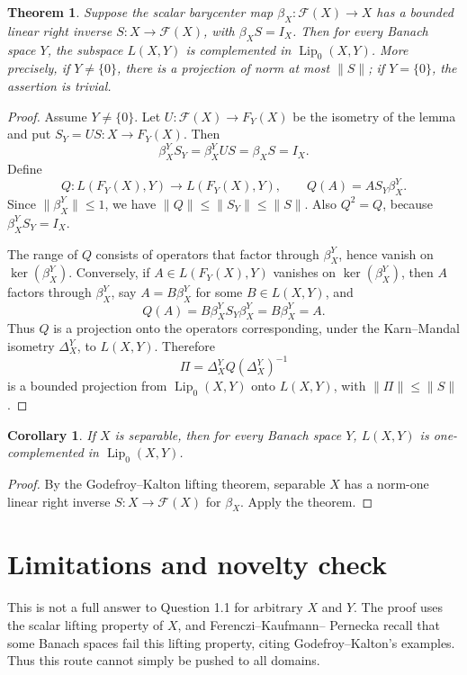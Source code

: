 \documentclass[11pt]{article}
\newtheorem{theorem}{Theorem}
\newtheorem{corollary}{Corollary}
\DeclareMathOperator{\Lip}{Lip}
\begin{document}
\begin{theorem}
Suppose the scalar barycenter map \(\beta_X:\mathcal F(X)\to X\) has a
bounded linear right inverse \(S:X\to\mathcal F(X)\), with
\(\beta_XS=I_X\). Then for every Banach space \(Y\), the subspace \(L(X,Y)\)
is complemented in \(\Lip_0(X,Y)\). More precisely, if \(Y\neq\{0\}\), there
is a projection of norm at most \(\|S\|\); if \(Y=\{0\}\), the assertion is
trivial.
\end{theorem}

\begin{proof}
Assume \(Y\neq\{0\}\). Let \(U:\mathcal F(X)\to F_Y(X)\) be the isometry of
the lemma and put \(S_Y=US:X\to F_Y(X)\). Then
\[
  \beta_X^Y S_Y=\beta_X^YUS=\beta_XS=I_X.
\]
Define
\[
  Q:L(F_Y(X),Y)\longrightarrow L(F_Y(X),Y),
  \qquad Q(A)=A S_Y\beta_X^Y.
\]
Since \(\|\beta_X^Y\|\leq 1\), we have \(\|Q\|\leq\|S_Y\|\leq\|S\|\).
Also \(Q^2=Q\), because \(\beta_X^YS_Y=I_X\).

The range of \(Q\) consists of operators that factor through \(\beta_X^Y\),
hence vanish on \(\ker(\beta_X^Y)\). Conversely, if
\(A\in L(F_Y(X),Y)\) vanishes on \(\ker(\beta_X^Y)\), then \(A\) factors
through \(\beta_X^Y\), say \(A=B\beta_X^Y\) for some \(B\in L(X,Y)\), and
\[
  Q(A)=B\beta_X^Y S_Y\beta_X^Y=B\beta_X^Y=A.
\]
Thus \(Q\) is a projection onto the operators corresponding, under the
Karn--Mandal isometry \(\Delta_X^Y\), to \(L(X,Y)\). Therefore
\[
  \Pi=\Delta_X^Y Q(\Delta_X^Y)^{-1}
\]
is a bounded projection from \(\Lip_0(X,Y)\) onto \(L(X,Y)\), with
\(\|\Pi\|\leq\|S\|\).
\end{proof}

\begin{corollary}
If \(X\) is separable, then for every Banach space \(Y\), \(L(X,Y)\) is
one-complemented in \(\Lip_0(X,Y)\).
\end{corollary}

\begin{proof}
By the Godefroy--Kalton lifting theorem, separable \(X\) has a norm-one
linear right inverse \(S:X\to\mathcal F(X)\) for \(\beta_X\). Apply the
theorem.
\end{proof}

\section*{Limitations and novelty check}

This is not a full answer to Question 1.1 for arbitrary \(X\) and \(Y\). The
proof uses the scalar lifting property of \(X\), and Ferenczi--Kaufmann--
Pernecka recall that some Banach spaces fail this lifting property, citing
Godefroy--Kalton's examples. Thus this route cannot simply be pushed to all
domains.
\end{document}
